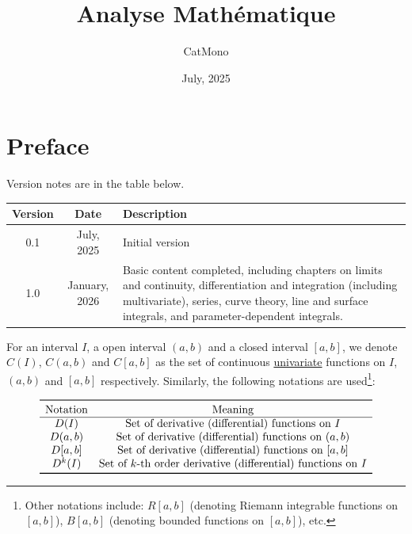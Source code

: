 \documentclass[11pt]{../../TexTemplate/elegantbook}
\title{Analyse Mathématique} %
\author{CatMono} %
\date{July, 2025} %
\begin{document}
\maketitle %

\frontmatter        %
\tableofcontents    %

\chapter{Preface}   %
Version notes are in the table below.
\begin{table}[h]
    \centering
    \begin{tabular}{ccp{12cm}}
        \toprule
        Version & Date & Description \\
        \toprule
        0.1 & July, 2025 & Initial version \\
        1.0 & January, 2026 & Basic content completed, including chapters on limits and continuity, 
            differentiation and integration (including multivariate), series, curve theory, line and surface integrals, 
            and parameter-dependent integrals. \\
        \bottomrule
    \end{tabular}
\end{table}

\vspace{0.7cm}
For an interval \(I\), a open interval \((a, b)\) and a closed interval \([a, b]\),
we denote \(C(I)\), \(C(a, b)\) and \(C[a, b]\)
as the set of continuous \underline{univariate} functions on \(I\), \((a, b)\) and \([a, b]\) respectively.
Similarly, the following notations are used\footnote{
    Other notations include: \(R[a,b]\) (denoting Riemann integrable functions on \([a,b]\)),
    \(B[a,b]\) (denoting bounded functions on \([a,b]\)), etc.
}:

\[
\begin{array}{cc}
\toprule
\text{Notation} & \text{Meaning} \\
\hline
D(I) & \text{Set of derivative (differential) functions on } I \\
D(a, b) & \text{Set of derivative (differential) functions on } (a, b) \\
D[a, b] & \text{Set of derivative (differential) functions on } [a, b] \\
D^{k}(I) & \text{Set of } k\text{-th order derivative (differential) functions on } I \\
\bottomrule
\end{array}
\]
\end{document}

